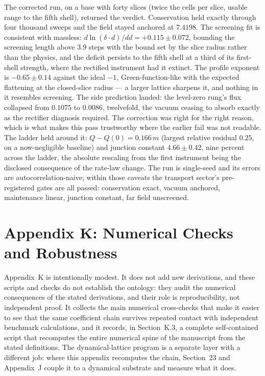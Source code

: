\documentclass[11pt]{article}
\begin{document}
The corrected run, on a base with forty slices (twice the cells per slice, usable range to the fifth shell), returned the verdict. Conservation held exactly through four thousand sweeps and the field stayed anchored at $7.4198$. The screening fit is consistent with massless: $d\ln(\delta\!\cdot\!d)/dd=+0.115\pm0.072$, bounding the screening length above $3.9$ steps with the bound set by the slice radius rather than the physics, and the deficit persists to the fifth shell at a third of its first-shell strength, where the rectified instrument had it extinct. The profile exponent is $-0.65\pm0.14$ against the ideal $-1$, Green-function-like with the expected flattening at the closed-slice radius --- a larger lattice sharpens it, and nothing in it resembles screening. The side prediction landed: the level-zero rung's flux collapsed from $0.1075$ to $0.0086$, twelvefold, the vacuum ceasing to absorb exactly as the rectifier diagnosis required. The correction was right for the right reason, which is what makes this pass trustworthy where the earlier fail was not readable. The ladder held around it: $Q-Q(0)=0.166\,m$ (largest relative residual $0.25$, on a now-negligible baseline) and junction constant $4.66\pm0.42$, nine percent across the ladder, the absolute rescaling from the first instrument being the disclosed consequence of the rate-law change. The run is single-seed and its errors are autocorrelation-naive; within those caveats the transport sector's pre-registered gates are all passed: conservation exact, vacuum anchored, maintenance linear, junction constant, far field unscreened.

\section*{Appendix K: Numerical Checks and Robustness}

Appendix~K is intentionally modest. It does not add new derivations, and these scripts and checks do not establish the ontology: they audit the numerical consequences of the stated derivations, and their role is reproducibility, not independent proof. It collects the main numerical cross-checks that make it easier to see that the same coefficient chain survives repeated contact with independent benchmark calculations, and it records, in Section~K.3, a complete self-contained script that recomputes the entire numerical spine of the manuscript from the stated definitions. The dynamical-lattice program is a separate layer with a different job: where this appendix recomputes the chain, Section~23 and Appendix~J couple it to a dynamical substrate and measure what it does.
\end{document}
